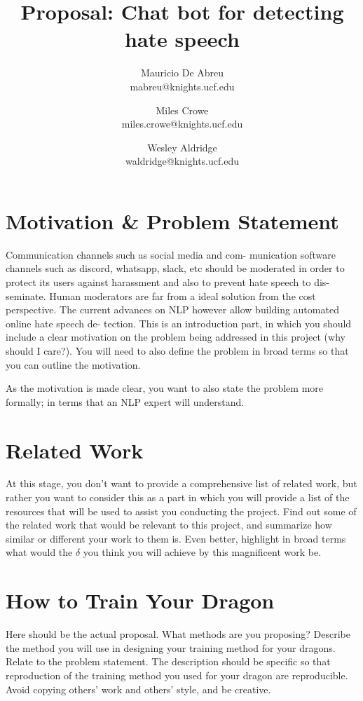 \documentclass[conference]{sig-alternate-05-2015}
\begin{document}
\title{Proposal: Chat bot for detecting hate speech}


\author{Mauricio De Abreu\\ mabreu@knights.ucf.edu \and Miles Crowe\\miles.crowe@knights.ucf.edu \and Wesley Aldridge\\waldridge@knights.ucf.edu}


\maketitle


\section{Motivation \& Problem Statement}\label{sec:motivation}
Communication channels such as social media and com-
munication software channels such as discord, whatsapp,
slack, etc should be moderated in order to protect its users
against harassment and also to prevent hate speech to dis-
seminate. Human moderators are far from a ideal solution
from the cost perspective. The current advances on NLP
however allow building automated online hate speech de-
tection.
\color{red}
This is an introduction part, in which you should include a clear motivation on the problem being addressed in this project (why should I care?). You will need to also define the problem in broad terms so that you can outline the motivation. 

As the motivation is made clear, you want to also state the problem more formally; in terms that an NLP expert will understand. 
\color{black}

\section{Related Work}\label{sec:related}
\color{red}At this stage, you don't want to provide a comprehensive list of related work, but rather you want to consider this as a part in which you will provide a list of the resources that will be used to assist you conducting the project. Find out some of the related work that would be relevant to this project, and summarize how similar or different your work to them is. Even better, highlight in broad terms what would the $\delta$ you think you will achieve by this magnificent work be. 
\color{black}


\section{How to Train Your Dragon}\label{sec:design}
\color{red}Here should be the actual proposal. What methods are you proposing? Describe the method you will use in designing your training method for your dragons. Relate to the problem statement. The description should be specific so that reproduction of the training method you used for your dragon are reproducible. Avoid copying others' work and others' style, and be creative. 
\color{black}
\end{document}
